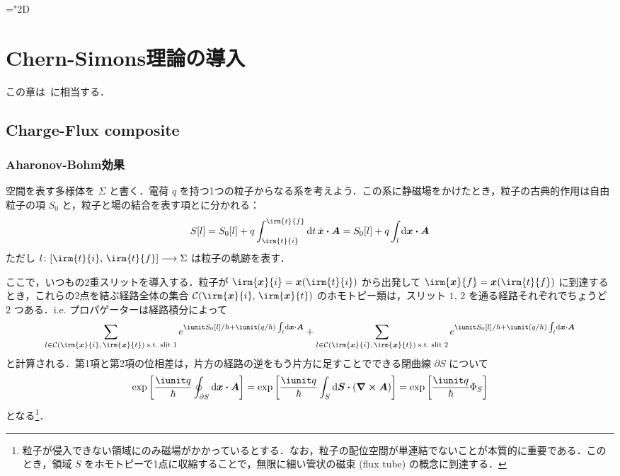 \documentclass[TQFT_main]{subfiles}
\begin{document}
\setcounter{chapter}{1}

\newcommand{\btl}{\blacktriangleleft}
\newcommand{\btr}{\blacktriangleright}
\newcommand{\Lie}[1]{#1^{\mathrm{L}}}
\newcommand{\evalunit}{\mathrm{ev}_{1_G}}
\mathchardef\mhyphen="2D

\chapter{Chern-Simons理論の導入}

この章は~\cite[Chapter4, 5]{Simon2021}に相当する．

\section{Charge-Flux composite}

\subsection{Aharonov-Bohm効果}

空間を表す多様体を $\Sigma$ と書く．電荷 $q$ を持つ1つの粒子からなる系を考えよう．この系に静磁場をかけたとき，粒子の古典的作用は自由粒子の項 $S_0$ と，粒子と場の結合を表す項とに分かれる：
\begin{align}
    S[l] = S_0[l] + q \int_{\irm{t}{i}}^{\irm{t}{f}} \dd{t} \dot{\bm{x}} \vdot \bm{A} = S_0[l] + q \int_l \dd{\bm{x}} \vdot \bm{A}
\end{align}
ただし $l \colon [\irm{t}{i},\, \irm{t}{f}] \lto \Sigma$ は粒子の軌跡を表す．

ここで，いつもの2重スリットを導入する．粒子が $\irm{\bm{x}}{i} = \bm{x}(\irm{t}{i})$ から出発して $\irm{\bm{x}}{f} = \bm{x}(\irm{t}{f})$ に到達するとき，これらの2点を結ぶ経路全体の集合 $\mathcal{C}(\irm{\bm{x}}{i},\, \irm{\bm{x}}{t})$ のホモトピー類は，スリット $1,\, 2$ を通る経路それぞれでちょうど $2$ つある．i.e.
プロパゲーターは経路積分によって
\begin{align}
    \sum_{l \in \mathcal{C}(\irm{\bm{x}}{i},\, \irm{\bm{x}}{t})\; \mathrm{s.t.}\;\mathrm{slit}\; 1} e^{\iunit S_0 [l] / \hbar + \iunit (q / \hbar) \int_l \dd{\bm{x}} \vdot \bm{A}} + \sum_{l \in \mathcal{C}(\irm{\bm{x}}{i},\, \irm{\bm{x}}{t})\; \mathrm{s.t.}\;\mathrm{slit}\; 2} e^{\iunit S_0 [l] / \hbar + \iunit (q / \hbar) \int_l \dd{\bm{x}} \vdot \bm{A}}
\end{align}
と計算される．第1項と第2項の位相差は，片方の経路の逆をもう片方に足すことでできる閉曲線 $\partial S$ について
\begin{align}
    \exp \left[ \frac{\iunit q}{\hbar} \oint_{\partial S} \dd{\bm{x}} \vdot \bm{A} \right] = \exp \left[ \frac{\iunit q}{\hbar} \int_S \dd{\bm{S}} \vdot (\curl{\bm{A}}) \right] = \exp \left[ \frac{\iunit q}{\hbar} \Phi_{S}\right] 
\end{align}
となる\footnote{粒子が侵入できない領域にのみ磁場がかかっているとする．なお，粒子の配位空間が単連結でないことが本質的に重要である．このとき，領域 $S$ をホモトピーで1点に収縮することで，無限に細い管状の磁束 (flux tube) の概念に到達する．}．
\end{document}
